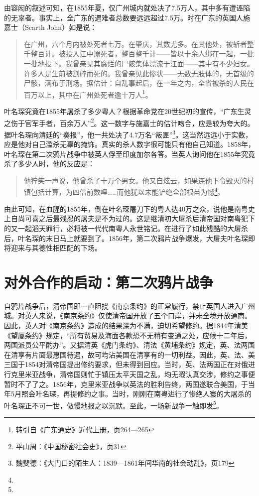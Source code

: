 由容闳的叙述可知，在1855年夏，仅广州城内就处决了7.5万人，其中多有遭诬陷的无辜者。事实上，全广东的遇难者总数要远远超过7.5万。时在广东的英国人施嘉士（Scarth John）如是说：

\begin{quote}
在广州，六个月内被处死者七万。在肇庆，其数尤多。在其他处，被斩者整千整百计。被投入江中溺死者，整百整千计——皆以十余人绑在一起，一批一批地投下。我曾亲见其腐烂的尸骸集体漂流于江面——其中有不少妇女。许多人是生前被割碎而死的。我曾亲见此惨状——无数无肢体的，无首级的尸骸，满布于刑场。据估计：自乱事起后，在一年之内，全省被杀的人民在百万以上，其中在广州处死者逾十万人\footnote{转引自《广东通史》近代上册，页264—265}。

\end{quote}

叶名琛究竟在1855年屠杀了多少粤人？根据革命党在20世纪初的宣传，“广东生灵之伤于官军手者，百余万人”\footnote{平山周：《中国秘密社会史》，页31}。这一数字与施嘉士的估计吻合，应是较为夸大的。据叶名琛向清廷的“奏报”，他一共处决了4.7万名“叛匪”\footnote{魏斐德：《大门口的陌生人：1839—1861年间华南的社会动乱》，页179}。这当然远远小于实数，应是他对自己滥杀无辜的掩饰。真实的杀人数字很可能只有他自己知道。1858年，叶名琛在第二次鸦片战争中被英人俘至印度加尔各答。当英人询问他在1855年究竟杀了多少人时，他的反应是：

\begin{quote}
他狞笑一声说，他曾杀了十万个男女。他又自炫云，如果连他下令毁灭的村镇包括计算，为四倍前数哩……而他犹以未能铲绝全部根苗为憾\footnote{}。

\end{quote}
由此可知，在血腥的1855年，倒在叶名琛屠刀下的粤人达40万之众，说他是南粤史上自尚可喜之后最残忍的屠夫是不为过的。这是继清初大屠杀后清帝国对南粤犯下的又一起滔天罪行，必将被一代代南粤人永世铭记。在进行了如此残酷的大屠杀后，叶名琛的末日马上就要到了。1856年，第二次鸦片战争爆发，大屠夫叶名琛即将迎来与其德性相匹配的下场。

\section{对外合作的启动：第二次鸦片战争}

自鸦片战争后，清帝国即一直阻挠《南京条约》的正常履行，禁止英国人进入广州城。对英人来说，《南京条约》仅使清帝国开放了五个口岸，并未全境开放通商。因此，英人对《南京条约》造成的结果深为不满，迫切希望修约。据1844年清美《望厦条约》规定，“所有贸易及海面各款恐不无稍有变通之处，应候十二年后，两国派员公平酌办”。又据清英《虎门条约》、清法《黄埔条约》规定，英、法两国在清享有片面最惠国待遇，故可均沾美国在清享有的一切利益。因此，英、法、美三国于1854对清帝国提出修约要求，但未得到回应。当时，英、法两国正在对俄进行克里米亚战争，清帝国则忙于镇压太平天国之乱，均无暇认真交涉，修约之事便暂时不了了之。1856年，克里米亚战争以英法的胜利告终，两国遂联合美国，于当年5月照会叶名琛，再提修约之事。当时，刚刚在南粤进行了惨绝人寰的大屠杀的叶名琛正不可一世，傲慢地报之以沉默。至此，一场新战争一触即发\footnote{}。

